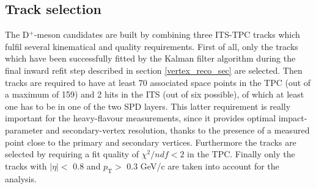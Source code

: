 \documentclass[b5paper,10pt,twoside,oldstyle,classica]{toptesi}
\newcommand{\pt}{p_\text{T}}
\begin{document}
\subsection{Track selection}
The D$^{+}$-meson candidates are built by combining three ITS-TPC tracks which fulfil several kinematical and quality requirements. First of all, only the tracks which have been successfully fitted by the Kalman filter algorithm during the final inward refit step described in section \ref{vertex_reco_sec} are selected. Then tracks are required to have at least 70 associated space points in the TPC (out of a maximum of 159) and 2 hits in the ITS (out of six possible), of which at least one has to be in one of the two SPD layers. This latter requirement is really important for the heavy-flavour measurements, since it provides optimal impact-parameter and secondary-vertex resolution, thanks to the presence of a measured point close to the primary and secondary vertices. Furthermore the tracks are selected by requiring a fit quality of $\chi^{2}/ndf < 2$ in the TPC. Finally only the tracks with $|\eta| <$ 0.8 and $\pt >$ 0.3 GeV/c are taken into account for the analysis.
\end{document}
